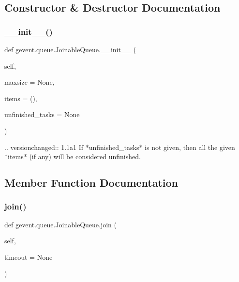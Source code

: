 \subsection{Constructor \& Destructor Documentation}
\mbox{\label{classgevent_1_1queue_1_1_joinable_queue_a99c05d351491a21ec311394bbb440de3}} 
\subsubsection{\texorpdfstring{\+\_\+\+\_\+init\+\_\+\+\_\+()}{\_\_init\_\_()}}
{\footnotesize\ttfamily def gevent.\+queue.\+Joinable\+Queue.\+\_\+\+\_\+init\+\_\+\+\_\+ (\begin{DoxyParamCaption}\item[{}]{self,  }\item[{}]{maxsize = {\ttfamily None},  }\item[{}]{items = {\ttfamily ()},  }\item[{}]{unfinished\+\_\+tasks = {\ttfamily None} }\end{DoxyParamCaption})}

\begin{DoxyVerb}.. versionchanged:: 1.1a1
   If *unfinished_tasks* is not given, then all the given *items*
   (if any) will be considered unfinished.\end{DoxyVerb}
 

\subsection{Member Function Documentation}
\mbox{\label{classgevent_1_1queue_1_1_joinable_queue_aa0916671ac43612e82934e6c8c1b3283}} 
\subsubsection{\texorpdfstring{join()}{join()}}
{\footnotesize\ttfamily def gevent.\+queue.\+Joinable\+Queue.\+join (\begin{DoxyParamCaption}\item[{}]{self,  }\item[{}]{timeout = {\ttfamily None} }\end{DoxyParamCaption})}

